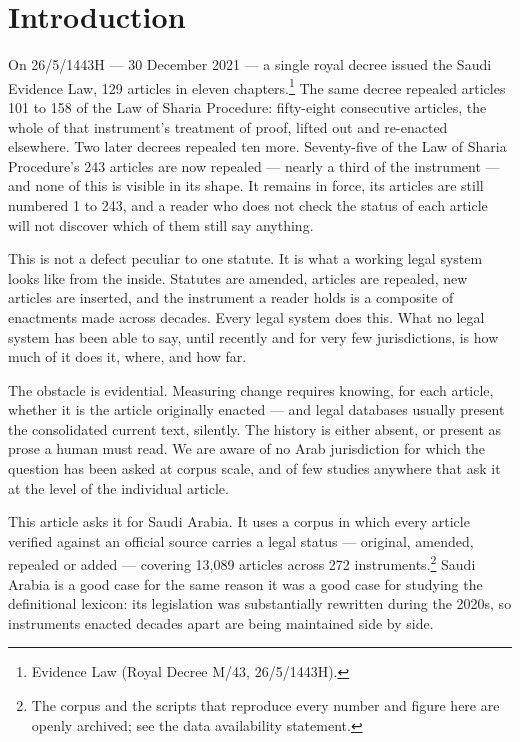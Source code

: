 \documentclass[11pt]{article}
\begin{document}
\section{Introduction}

On 26/5/1443H --- 30 December 2021 --- a single royal decree issued the Saudi
Evidence Law, 129 articles in eleven chapters.\footnote{Evidence Law (Royal
Decree M/43, 26/5/1443H).} The same decree repealed articles 101 to 158 of the
Law of Sharia Procedure: fifty-eight consecutive articles, the whole of that
instrument's treatment of proof, lifted out and re-enacted elsewhere. Two
later decrees repealed ten more. Seventy-five of the Law of Sharia Procedure's
243 articles are now repealed --- nearly a third of the instrument --- and
none of this is visible in its shape. It remains in force, its articles are
still numbered 1 to 243, and a reader who does not check the status of each
article will not discover which of them still say anything.

This is not a defect peculiar to one statute. It is what a working legal
system looks like from the inside. Statutes are amended, articles are
repealed, new articles are inserted, and the instrument a reader holds is a
composite of enactments made across decades. Every legal system does this.
What no legal system has been able to say, until recently and for very few
jurisdictions, is how much of it does it, where, and how far.

The obstacle is evidential. Measuring change requires knowing, for each
article, whether it is the article originally enacted --- and legal databases
usually present the consolidated current text, silently. The history is
either absent, or present as prose a human must read. We are aware of no Arab
jurisdiction for which the question has been asked at corpus scale, and of few
studies anywhere that ask it at the level of the individual article.

This article asks it for Saudi Arabia. It uses a corpus in which every article
verified against an official source carries a legal status --- original,
amended, repealed or added --- covering 13,089 articles across 272
instruments.\footnote{The corpus and the scripts that reproduce every number
and figure here are openly archived; see the data availability statement.}
Saudi Arabia is a good case for the same reason it was a good case for
studying the definitional lexicon: its legislation was substantially rewritten
during the 2020s, so instruments enacted decades apart are being maintained
side by side.
\end{document}
